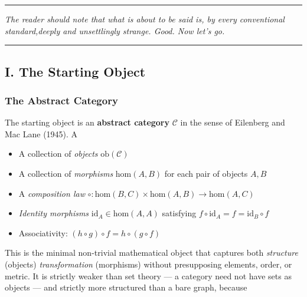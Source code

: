 \documentclass[12pt,a4paper]{article}
\makeatletter
\renewcommand{\_}{\ig@origunderscore\discretionary{}{}{}}
\makeatother
\begin{document}
\begin{center}
\rule{0.5\textwidth}{0.4pt}
\end{center}

\begin{center}
\emph{The reader should note that what is about to be said is, by every conventional standard,deeply and unsettlingly strange. Good. Now let's go.}
\end{center}

\begin{center}
\rule{0.5\textwidth}{0.4pt}
\end{center}


\subsection{I. The Starting Object}

\subsubsection{The Abstract Category}
The starting object is an \textbf{abstract category} $\mathcal{C}$ in the sense of Eilenberg and Mac Lane (1945). A

\begin{itemize}
 \item A collection of \emph{objects} $\text{ob}(\mathcal{C})$
 \item A collection of \emph{morphisms} $\text{hom}(A, B)$ for each pair of objects $A, B$
 \item A \emph{composition law} $\circ: \text{hom}(B,C) \times \text{hom}(A,B) \to
 \text{hom}(A,C)$
 \item \emph{Identity morphisms} $\text{id}_A \in \text{hom}(A,A)$ satisfying $f \circ
 \text{id}_A = f = \text{id}_B
\circ f$
 \item Associativity: $(h \circ g) \circ f = h \circ (g \circ f)$
\end{itemize}

This is the minimal non-trivial mathematical object that captures both \emph{structure} (objects)
\emph{transformation} (morphisms) without presupposing elements, order, or metric. It is strictly weaker than set
theory --- a category need not have sets as objects --- and strictly more structured than a bare graph, because
\
\end{document}
